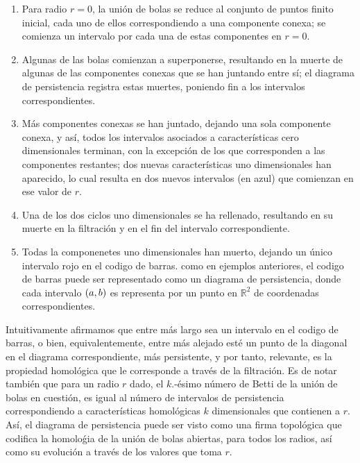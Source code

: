 \begin{enumerate}[label=\alph*)]
    \item Para radio $r=0$, la uni\'on de bolas se reduce al conjunto de puntos finito inicial,
    cada uno de ellos correspondiendo a una componente conexa;
    se comienza un intervalo por cada una de estas componentes en $r=0$.

    \item Algunas de las bolas comienzan a superponerse,
    resultando en la muerte de algunas de las componentes conexas que se han juntando entre s\'i;
    el diagrama de persistencia registra estas muertes, poniendo fin a los intervalos correspondientes.
    
    \item M\'as componentes conexas se han juntado, dejando una sola componente conexa,
    y as\'i, todos los intervalos asociados a caracter\'isticas cero dimensionales terminan,
    con la excepci\'on de los que corresponden a las componentes restantes;
    dos nuevas caracter\'isticas uno dimensionales han aparecido,
    lo cual resulta en dos nuevos intervalos (en azul) que comienzan en ese valor de $r$.
    
    \item Una de los dos ciclos uno dimensionales se ha rellenado,
    resultando en su muerte en la filtraci\'on y en el fin del intervalo correspondiente.
    
    \item Todas la componenetes uno dimensionales han muerto, dejando un \'unico intervalo rojo en el codigo de barras.
    como en ejemplos anteriores, el codigo de barras puede ser representado como un diagrama de persistencia,
    donde cada intervalo $\left(a,b\right)$ es representa por un punto en $\mathbb{R}^{2}$ de coordenadas correspondientes.
    
\end{enumerate}

Intuitivamente afirmamos que entre m\'as largo sea un intervalo en el codigo de barras,
o bien, equivalentemente,
entre m\'as alejado est\'e un punto de la diagonal en el diagrama correspondiente,
m\'as persistente, y por tanto, relevante, es la propiedad homol\'ogica que le corresponde a trav\'es de la filtraci\'on.
Es de notar tambi\'en que para un radio $r$ dado, el $k$.-\'esimo n\'umero de Betti de la uni\'on de bolas en cuesti\'on,
es igual al n\'umero de intervalos de persistencia correspondiendo a caracter\'isticas homol\'ogicas $k$ dimensionales que contienen a $r$.
As\'i, el diagrama de persistencia puede ser visto como una firma topol\'ogica que codifica la homolo\'gia de la uni\'on de bolas abiertas,
para todos los radios, as\'i como su evoluci\'on a trav\'es de los valores que toma $r$.

